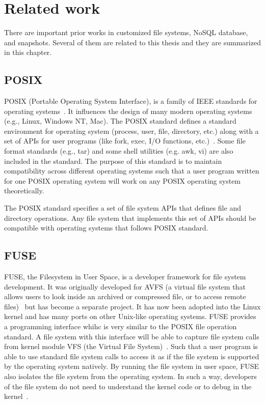 \chapter{Related work}
\label{chap:related_work}

    There are important prior works in customized file systems, NoSQL database, and snapshots. Several of them are related to this thesis and they are summarized in this chapter.

\section{POSIX}

    POSIX (Portable Operating System Interface), is a family of IEEE standards for operating systems~\cite{posix_wiki}. It influences the design of many modern operating systems (e.g., Linux, Windows NT, Mac). The POSIX standard defines a standard environment for operating system (process, user, file, directory, etc.) along with a set of APIs for user programs (like fork, exec, I/O functions, etc.)~\cite{posix}. Some file format standards (e.g., tar) and some shell utilities (e.g. awk, vi) are also included in the standard. The purpose of this standard is to maintain compatibility across different operating systems such that a user program written for one POSIX operating system will work on any POSIX operating system theoretically. 

    The POSIX standard specifies a set of file system APIs that defines file and directory operations. Any file system that implements this set of APIs should be compatible with operating systems that follows POSIX standard.

\section{FUSE}

    FUSE, the Filesystem in User Space, is a developer framework for file system development. It was originally developed for AVFS (a virtual file system that allows users to look inside an archived or compressed file, or to access remote files)~\cite{avfs} but has become a separate project. It has now been adopted into the Linux kernel and has many ports on other Unix-like operating systems. FUSE provides a programming interface whihc is very similar to the POSIX file operation standard. A file system with this interface will be able to capture file system calls from kernel module VFS (the Virtual File System)~\cite{vfs}. Such that a user program is able to use standard file system calls to access it as if the file system is supported by the operating system natively. By running the file system in user space, FUSE also isolates the file system from the operating system. In such a way, developers of the file system do not need to understand the kernel code or to debug in the kernel~\cite{fuse}.

